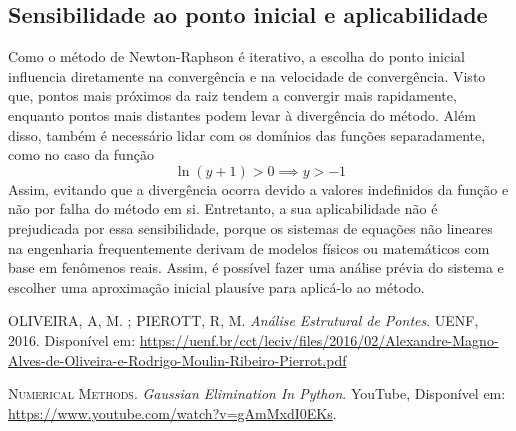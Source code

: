 \documentclass{article}
\begin{document}
\subsection*{Sensibilidade ao ponto inicial e aplicabilidade}
Como o método de Newton-Raphson é iterativo, a escolha do ponto inicial influencia diretamente na convergência e na velocidade de convergência. Visto que, pontos mais próximos da raiz tendem a convergir mais rapidamente, 
enquanto pontos mais distantes podem levar à divergência do método.
Além disso, também é necessário lidar com os domínios das funções separadamente, como no caso da função \begin{equation*}\ln(y+1) > 0 \implies y > -1\end{equation*} 
Assim, evitando que a divergência ocorra devido a valores indefinidos da função e não por falha do método em si. Entretanto, a sua aplicabilidade não é prejudicada por essa sensibilidade, porque os sistemas de equações não lineares na engenharia 
frequentemente derivam de modelos físicos ou matemáticos com base em fenômenos reais. Assim, é possível fazer uma análise prévia do sistema e escolher uma aproximação inicial plausíve para aplicá-lo ao método.


\begin{thebibliography}{9}
OLIVEIRA, A, M. ; PIEROTT, R, M.
\textit{Análise Estrutural de Pontes}. 
UENF, 2016. Disponível em: \url{https://uenf.br/cct/leciv/files/2016/02/Alexandre-Magno-Alves-de-Oliveira-e-Rodrigo-Moulin-Ribeiro-Pierrot.pdf}

\textsc{Numerical Methods}. \textit{Gaussian Elimination In Python}. YouTube, Disponível em: \url{https://www.youtube.com/watch?v=gAmMxdI0EKs}.

\end{thebibliography}
\end{document}

